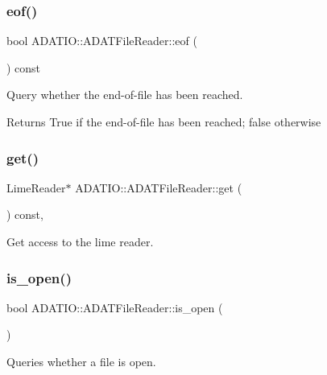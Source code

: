 \subsubsection{\texorpdfstring{eof()}{eof()}}
{\footnotesize\ttfamily bool A\+D\+A\+T\+I\+O\+::\+A\+D\+A\+T\+File\+Reader\+::eof (\begin{DoxyParamCaption}{ }\end{DoxyParamCaption}) const}



Query whether the end-\/of-\/file has been reached. 

\begin{DoxyReturn}{Returns}
True if the end-\/of-\/file has been reached; false otherwise 
\end{DoxyReturn}
\mbox{\label{group__qio_ga40c1ee10fe351724bdfc91f4fd655328}} 
\subsubsection{\texorpdfstring{get()}{get()}}
{\footnotesize\ttfamily Lime\+Reader$\ast$ A\+D\+A\+T\+I\+O\+::\+A\+D\+A\+T\+File\+Reader\+::get (\begin{DoxyParamCaption}{ }\end{DoxyParamCaption}) const\hspace{0.3cm}{\ttfamily [inline]}, {\ttfamily [protected]}}



Get access to the lime reader. 

\mbox{\label{group__qio_ga601972c66a6e6671d7b41ee1bce80e82}} 
\subsubsection{\texorpdfstring{is\_open()}{is\_open()}\hspace{0.1cm}{\footnotesize\ttfamily [1/2]}}
{\footnotesize\ttfamily bool A\+D\+A\+T\+I\+O\+::\+A\+D\+A\+T\+File\+Reader\+::is\+\_\+open (\begin{DoxyParamCaption}{ }\end{DoxyParamCaption})}



Queries whether a file is open. 

